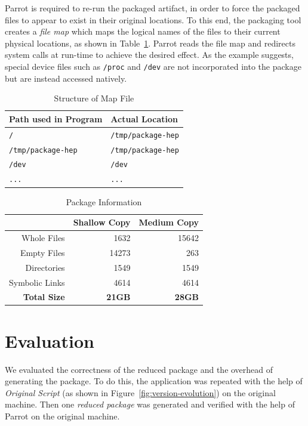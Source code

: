 \documentclass{sig-alternate}
\begin{document}
Parrot is required to re-run the packaged artifact, in order to force
the packaged files to appear to exist in their original locations.
To this end, the packaging tool creates a \emph{file map} which maps
the logical names of the files to their current physical locations, as shown in Table~\ref{table:map-file}.
Parrot reads the file map and redirects system calls at run-time to achieve the desired effect.
As the example suggests, special device files such as {\tt /proc} and {\tt /dev}
are not incorporated into the package but are instead accessed natively.

\begin{table}
    \centering
    \begin{tabular}{|l|l|}
    \hline
    \bf Path used in Program & \bf Actual Location \\ \hline
    {\tt /} & {\tt /tmp/package-hep} \\ \hline
    {\tt /tmp/package-hep} & {\tt /tmp/package-hep} \\ \hline
    {\tt /dev} & {\tt /dev} \\ \hline
    {\tt ...} & {\tt ...}\\ \hline
    \end{tabular}
    \caption{Structure of Map File}
    \label{table:map-file}
\end{table}

\begin{table}
    \centering
    \begin{tabular}{|r|r|r|}
\hline
                    & \bf Shallow Copy & \bf Medium Copy\\
\hline
    Whole Files    & 1632         & 15642\\ 
\hline
    Empty Files    & 14273        & 263\\
\hline
    Directories    & 1549         & 1549\\ 
\hline
    Symbolic Links & 4614         & 4614 \\
\hline
    \bf Total Size & \bf 21GB     & \bf 28GB \\ 
\hline
    \end{tabular}
    \caption{Package Information}
    \label{table:package-info}
\end{table}


\section{Evaluation}

We evaluated the correctness of the reduced package and the overhead of generating the package.
To do this, the application was repeated with the help of \emph{Original Script} (as shown in Figure~\ref{fig:version-evolution}) on the original machine. 
Then one \emph{reduced package} was generated and verified with the help of Parrot on the original machine.
\end{document}
